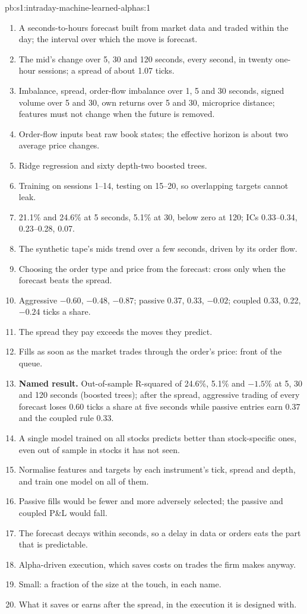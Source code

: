 \begin{solution}{pb:s1:intraday-machine-learned-alphas:1}
\begin{enumerate}
\item A seconds-to-hours forecast built from market data and traded within the day; the interval over which the move is forecast.
\item The mid's change over 5, 30 and 120 seconds, every second, in twenty one-hour sessions; a spread of about 1.07 ticks.
\item Imbalance, spread, order-flow imbalance over 1, 5 and 30 seconds, signed volume over 5 and 30, own returns over 5 and 30, microprice distance;
features must not change when the future is removed.
\item Order-flow inputs beat raw book states; the effective horizon is about two average price changes.
\item Ridge regression and sixty depth-two boosted trees.
\item Training on sessions 1--14, testing on 15--20, so overlapping targets cannot leak.
\item 21.1\% and 24.6\% at 5 seconds, 5.1\% at 30, below zero at 120; ICs 0.33--0.34, 0.23--0.28, 0.07.
\item The synthetic tape's mids trend over a few seconds, driven by its order flow.
\item Choosing the order type and price from the forecast: cross only when the forecast beats the spread.
\item Aggressive $-0.60$, $-0.48$, $-0.87$; passive 0.37, 0.33, $-0.02$; coupled 0.33, 0.22, $-0.24$ ticks a share.
\item The spread they pay exceeds the moves they predict.
\item Fills as soon as the market trades through the order's price: front of the queue.
\item \textbf{Named result.} Out-of-sample R-squared of 24.6\%, 5.1\% and $-1.5\%$ at 5, 30 and 120 seconds (boosted trees); after the spread, aggressive trading
of every forecast loses 0.60 ticks a share at five seconds while passive entries earn 0.37 and the coupled rule 0.33.
\item A single model trained on all stocks predicts better than stock-specific ones, even out of sample in stocks it has not seen.
\item Normalise features and targets by each instrument's tick, spread and depth, and train one model on all of them.
\item Passive fills would be fewer and more adversely selected; the passive and coupled P\&L would fall.
\item The forecast decays within seconds, so a delay in data or orders eats the part that is predictable.
\item Alpha-driven execution, which saves costs on trades the firm makes anyway.
\item Small: a fraction of the size at the touch, in each name.
\item What it saves or earns after the spread, in the execution it is designed with.
\end{enumerate}
\end{solution}

